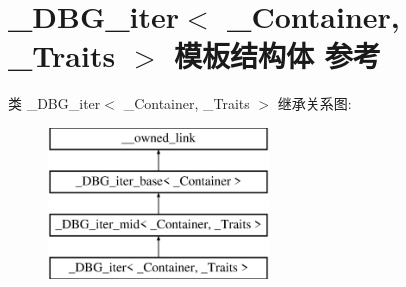 \hypertarget{struct___d_b_g__iter}{}\section{\+\_\+\+D\+B\+G\+\_\+iter$<$ \+\_\+\+Container, \+\_\+\+Traits $>$ 模板结构体 参考}
\label{struct___d_b_g__iter}
类 \+\_\+\+D\+B\+G\+\_\+iter$<$ \+\_\+\+Container, \+\_\+\+Traits $>$ 继承关系图\+:\begin{figure}[H]
\begin{center}
\leavevmode
\includegraphics[height=4.000000cm]{struct___d_b_g__iter}
\end{center}
\end{figure}
